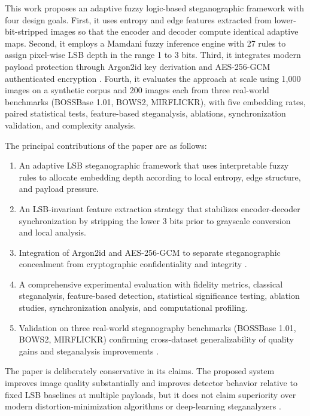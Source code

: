 This work proposes an adaptive fuzzy logic-based steganographic framework with four design goals. First, it uses entropy and edge features extracted from lower-bit-stripped images so that the encoder and decoder compute identical adaptive maps. Second, it employs a Mamdani fuzzy inference engine with 27 rules to assign pixel-wise LSB depth in the range 1 to 3 bits. Third, it integrates modern payload protection through Argon2id key derivation and AES-256-GCM authenticated encryption \cite{rfc9106,nistgcm}. Fourth, it evaluates the approach at scale using 1,000 images on a synthetic corpus and 200 images each from three real-world benchmarks (BOSSBase 1.01, BOWS2, MIRFLICKR), with five embedding rates, paired statistical tests, feature-based steganalysis, ablations, synchronization validation, and complexity analysis.

The principal contributions of the paper are as follows:
\begin{enumerate}[leftmargin=1.2cm]
    \item An adaptive LSB steganographic framework that uses interpretable fuzzy rules to allocate embedding depth according to local entropy, edge structure, and payload pressure.
    \item An LSB-invariant feature extraction strategy that stabilizes encoder-decoder synchronization by stripping the lower 3 bits prior to grayscale conversion and local analysis.
    \item Integration of Argon2id and AES-256-GCM to separate steganographic concealment from cryptographic confidentiality and integrity \cite{rfc9106,nistgcm}.
    \item A comprehensive experimental evaluation with fidelity metrics, classical steganalysis, feature-based detection, statistical significance testing, ablation studies, synchronization analysis, and computational profiling.
    \item Validation on three real-world steganography benchmarks (BOSSBase 1.01, BOWS2, MIRFLICKR) confirming cross-dataset generalizability of quality gains and steganalysis improvements \cite{bas2011boss,bows2007,huiskes2008}.
\end{enumerate}

The paper is deliberately conservative in its claims. The proposed system improves image quality substantially and improves detector behavior relative to fixed LSB baselines at multiple payloads, but it does not claim superiority over modern distortion-minimization algorithms or deep-learning steganalyzers \cite{fridrich2012rich,kodovsky2012ensemble,yedroudj2018,boroumand2019,alrusaini2025}.

